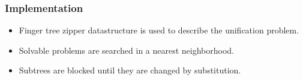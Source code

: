 
\begin{frame}
\frametitle{Implementation}
\begin{itemize}
\item Finger tree zipper datastructure is used to describe the unification problem.
\item Solvable problems are searched in a nearest neighborhood. 
\item Subtrees are blocked until they are changed by substitution.
\end{itemize}
\end{frame}
